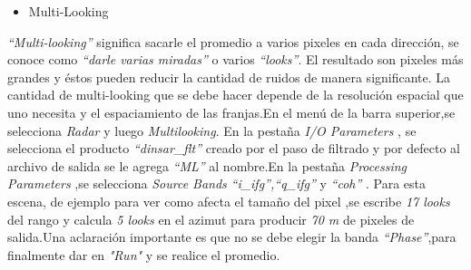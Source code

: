 \documentclass{article}
\begin{document}
\begin{itemize}
    \item Multi-Looking 
\end{itemize}
\textit{“Multi-looking”} significa sacarle el promedio a varios pixeles en cada dirección, se conoce como \textit{“darle varias miradas”} o varios \textit{“looks”}. El resultado son pixeles más
grandes y éstos pueden reducir la cantidad de ruidos de manera
significante. La cantidad de multi-looking que se debe hacer depende de la resolución espacial que uno necesita y el espaciamiento de las franjas.En el menú de la barra superior,se  selecciona \textit{Radar} y luego \textit{Multilooking}. En la pestaña \textit{I/O Parameters} , se selecciona el producto \textit{“dinsar\_flt”}  creado por el paso de filtrado y por defecto al archivo de salida se le agrega \textit{“ML”} al nombre.En la pestaña  \textit{Processing Parameters} ,se selecciona \textit{Source Bands}  \textit{“i\_ifg”,“q\_ifg”}  y \textit{“coh”} . Para esta escena, de ejemplo para ver como afecta el tamaño del pixel ,se escribe \textit{17 looks}  del rango y  calcula \textit{5 looks} en el azimut para producir  \backsim \textit{70 m} de pixeles de salida.Una aclaración importante es que no se debe elegir la banda  \textit{“Phase”},para finalmente dar en \textit{"Run"} y se realice el promedio.
\end{document}
